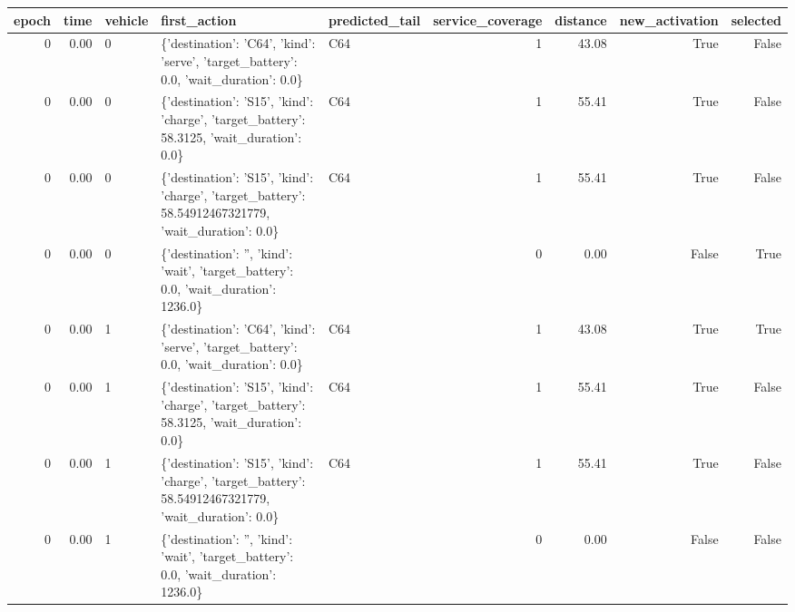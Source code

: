 \begin{tabular}{rrlllrrrr}
\toprule
epoch & time & vehicle & first\_action & predicted\_tail & service\_coverage & distance & new\_activation & selected \\
\midrule
0 & 0.00 & 0 & \{'destination': 'C64', 'kind': 'serve', 'target\_battery': 0.0, 'wait\_duration': 0.0\} & C64 & 1 & 43.08 & True & False \\
0 & 0.00 & 0 & \{'destination': 'S15', 'kind': 'charge', 'target\_battery': 58.3125, 'wait\_duration': 0.0\} & C64 & 1 & 55.41 & True & False \\
0 & 0.00 & 0 & \{'destination': 'S15', 'kind': 'charge', 'target\_battery': 58.54912467321779, 'wait\_duration': 0.0\} & C64 & 1 & 55.41 & True & False \\
0 & 0.00 & 0 & \{'destination': '', 'kind': 'wait', 'target\_battery': 0.0, 'wait\_duration': 1236.0\} &  & 0 & 0.00 & False & True \\
0 & 0.00 & 1 & \{'destination': 'C64', 'kind': 'serve', 'target\_battery': 0.0, 'wait\_duration': 0.0\} & C64 & 1 & 43.08 & True & True \\
0 & 0.00 & 1 & \{'destination': 'S15', 'kind': 'charge', 'target\_battery': 58.3125, 'wait\_duration': 0.0\} & C64 & 1 & 55.41 & True & False \\
0 & 0.00 & 1 & \{'destination': 'S15', 'kind': 'charge', 'target\_battery': 58.54912467321779, 'wait\_duration': 0.0\} & C64 & 1 & 55.41 & True & False \\
0 & 0.00 & 1 & \{'destination': '', 'kind': 'wait', 'target\_battery': 0.0, 'wait\_duration': 1236.0\} &  & 0 & 0.00 & False & False \\
\bottomrule
\end{tabular}
